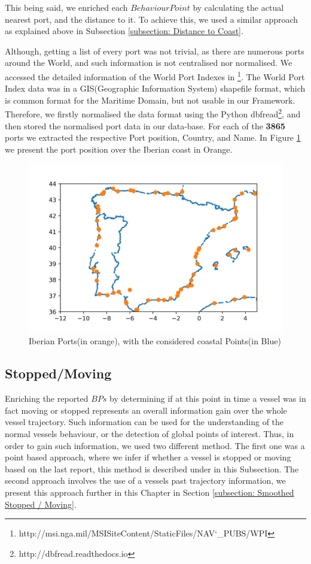 This being said, we enriched each $Behaviour Point$ by calculating the actual nearest port, and the distance to it. To achieve this, we used a similar approach as explained above in Subsection \ref{subsection: Distance to Coast}.

Although, getting a list of every port was not trivial, as there are numerous ports around the World, and such information is not 
centralised nor normalised.
We accessed the detailed information of the World Port Indexes in \footnote{http://msi.nga.mil/MSISiteContent/StaticFiles/NAV\char`_PUBS/WPI}. The World Port Index data was in a GIS(Geographic Information System) shapefile format, which is common format for the Maritime Domain, but not usable in our Framework. Therefore, we firstly normalised the data format using the Python dbfread\footnote{http://dbfread.readthedocs.io}, and then stored the normalised port data in our data-base. 
For each of the \textbf{3865} ports we extracted the respective Port position, Country, and Name. 
In Figure \ref{fig: 4 Ports} we present the port position over the Iberian coast in Orange.

\begin{figure}[H]
\centering
\includegraphics[scale = .9]{figures/Ch4/ports.png}
\caption{Iberian Ports(in orange), with the considered coastal Points(in Blue)}
\label{fig: 4 Ports}
\end{figure}

\subsection{Stopped/Moving}
\label{subsection: Stopped/Moving}
Enriching the reported $BPs$ by determining if at this point in time a vessel was in fact moving or stopped represents an overall information gain over the whole vessel trajectory. Such information can be used for the understanding of the normal vessels behaviour, or the detection of global points of interest.
Thus, in order to gain such information, we used two different method. The first one was a point based approach, where we infer if whether a vessel is stopped or moving based on the last report, this method is described under in this Subsection. The second approach involves the use of a vessels past trajectory information, we present this approach further in this Chapter in Section \ref{subsection: Smoothed Stopped / Moving}.

